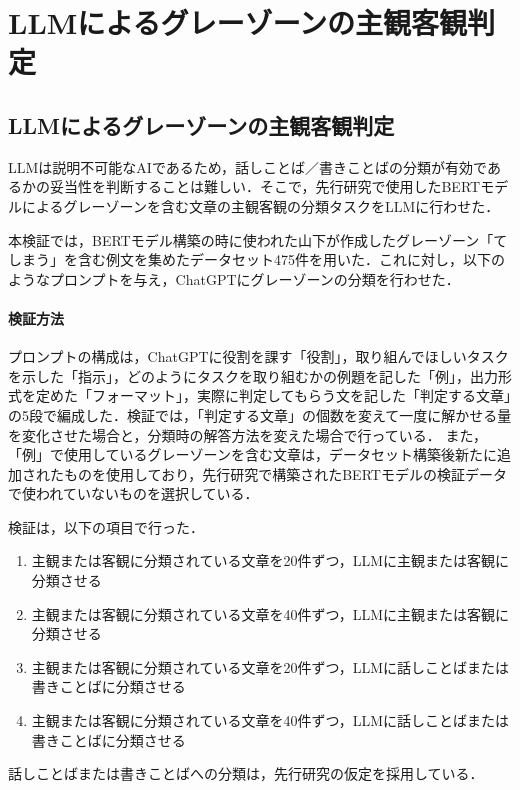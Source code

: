 \chapter{LLMによるグレーゾーンの主観客観判定 \label{c6}}


\section{LLMによるグレーゾーンの主観客観判定 \label{c6s2}}
LLMは説明不可能なAIであるため，話しことば／書きことばの分類が有効であるかの妥当性を判断することは難しい．そこで，先行研究で使用したBERTモデルによるグレーゾーンを含む文章の主観客観の分類タスクをLLMに行わせた．

本検証では，BERTモデル構築の時に使われた山下が作成したグレーゾーン「てしまう」を含む例文を集めたデータセット475件を用いた．これに対し，以下のようなプロンプトを与え，ChatGPTにグレーゾーンの分類を行わせた．



\subsubsection{検証方法}
プロンプトの構成は，ChatGPTに役割を課す「役割」，取り組んでほしいタスクを示した「指示」，どのようにタスクを取り組むかの例題を記した「例」，出力形式を定めた「フォーマット」，実際に判定してもらう文を記した「判定する文章」の5段で編成した．検証では，「判定する文章」の個数を変えて一度に解かせる量を変化させた場合と，分類時の解答方法を変えた場合で行っている．
また，「例」で使用しているグレーゾーンを含む文章は，データセット構築後新たに追加されたものを使用しており，先行研究\cite{ai-checker}で構築されたBERTモデルの検証データで使われていないものを選択している．


検証は，以下の項目で行った．
\begin{enumerate}
    \item 主観または客観に分類されている文章を20件ずつ，LLMに主観または客観に分類させる
    \item 主観または客観に分類されている文章を40件ずつ，LLMに主観または客観に分類させる
    \item 主観または客観に分類されている文章を20件ずつ，LLMに話しことばまたは書きことばに分類させる
    \item 主観または客観に分類されている文章を40件ずつ，LLMに話しことばまたは書きことばに分類させる
\end{enumerate}
話しことばまたは書きことばへの分類は，先行研究\cite{checker}の仮定を採用している．

